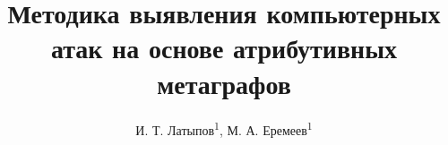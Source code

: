 \title{Методика выявления компьютерных атак на основе атрибутивных метаграфов}
\author{И. Т. Латыпов\textsuperscript{1}, М. А. Еремеев\textsuperscript{1}}
\date{}